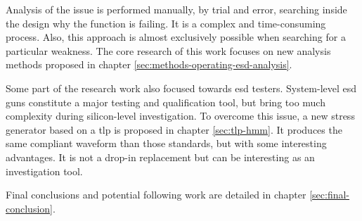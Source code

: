 %
Analysis of the issue is performed manually, by trial and error, searching inside the design why the function is failing.
It is a complex and time-consuming process.
Also, this approach is almost exclusively possible when searching for a particular weakness.
The core research of this work focuses on new analysis methods proposed in chapter \ref{sec:methods-operating-esd-analysis}.

%
Some part of the research work also focused towards \gls{esd} testers.
System-level \gls{esd} guns \cite{iec61000-4-2, iso10605} constitute a major testing and qualification tool, but bring too much complexity during silicon-level investigation.
To overcome this issue, a new stress generator based on a \gls{tlp} is proposed in chapter \ref{sec:tlp-hmm}.
It produces the same compliant waveform than those standards, but with some interesting advantages.
It is not a drop-in replacement but can be interesting as an investigation tool.

%
Final conclusions and potential following work are detailed in chapter \ref{sec:final-conclusion}.
